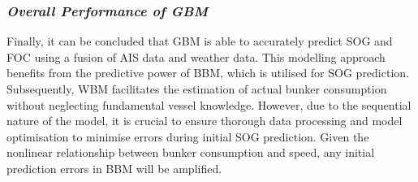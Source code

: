 \subsubsection*{\emph{Overall Performance of GBM}}

Finally, it can be concluded that GBM is able to accurately predict SOG and FOC using a fusion of AIS data and weather data. This modelling approach benefits from the predictive power of BBM, which is utilised for SOG prediction. Subsequently, WBM facilitates the estimation of actual bunker consumption without neglecting fundamental vessel knowledge.  However, due to the sequential nature of the model, it is crucial to ensure thorough data processing and model optimisation to minimise errors during initial SOG prediction. Given the nonlinear relationship between bunker consumption and speed, any initial prediction errors in BBM will be amplified.\\













